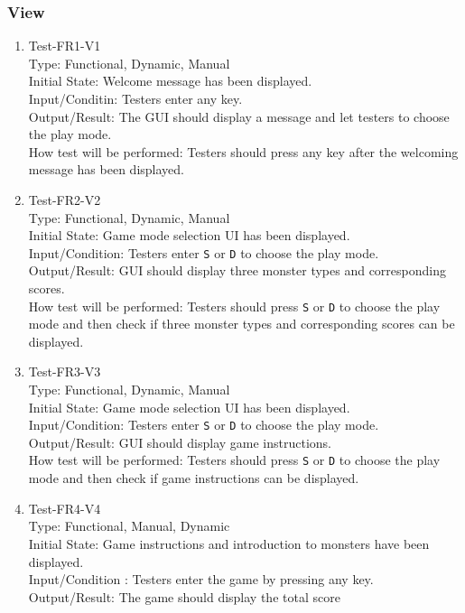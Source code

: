 \documentclass[12pt]{article}
\begin{document}
\subsubsection{View}
\begin{enumerate}[1.]
\item Test-FR1-V1\\
Type: Functional, Dynamic, Manual\\
Initial State: Welcome message has been displayed.\\
Input/Conditin: Testers enter any key.\\
Output/Result: The GUI should display a message and let testers
to choose the play mode.\\
How test will be performed: Testers should press any 
key after the welcoming message has been displayed. 
\item Test-FR2-V2\\
Type: Functional, Dynamic, Manual\\
Initial State: Game mode selection UI has been displayed.\\
Input/Condition: Testers enter \verb|S| or \verb|D| to
choose the play mode.\\
Output/Result: GUI should display three monster types and corresponding scores.\\
How test will be performed: Testers should press \verb|S| or \verb|D| to
choose the play mode and then check if three monster 
types and corresponding scores can be displayed.
\item Test-FR3-V3\\
Type: Functional, Dynamic, Manual\\
Initial State: Game mode selection UI has been displayed.\\
Input/Condition: Testers enter \verb|S| or \verb|D| to
choose the play mode.\\
Output/Result: GUI should display game instructions.\\
How test will be performed: Testers should press \verb|S| or \verb|D| to
choose the play mode and then check if 
game instructions can be displayed.
\item Test-FR4-V4\\
Type: Functional, Manual, Dynamic\\
Initial State:  Game instructions and introduction to 
monsters have been displayed.\\
Input/Condition
: Testers enter the game by pressing any key.\\
Output/Result: The game should display the total score

\end{enumerate}
\end{document}
